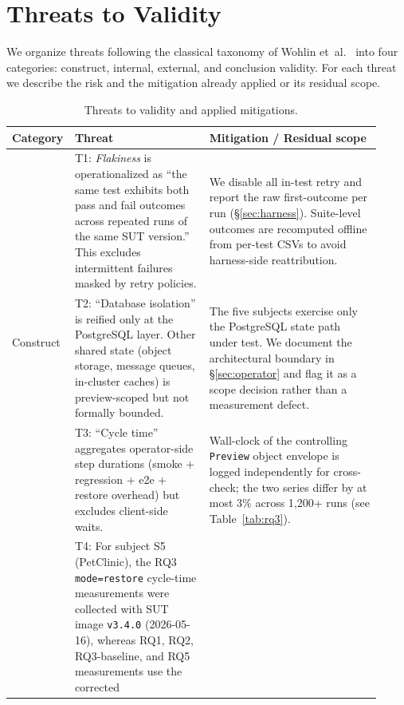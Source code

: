 \section{Threats to Validity}
\label{sec:threats}

We organize threats following the classical taxonomy of Wohlin
et~al.~\cite{wohlin2012experimentation} into four categories: construct,
internal, external, and conclusion validity. For each threat we describe the
risk and the mitigation already applied or its residual scope.

\begin{table}[t]
\centering
\caption{Threats to validity and applied mitigations.}
\label{tab:threats}
\small
\begin{tabular}{p{0.10\linewidth} p{0.36\linewidth} p{0.46\linewidth}}
\hline
\textbf{Category} & \textbf{Threat} & \textbf{Mitigation / Residual scope} \\
\hline
\multirow{3}{*}{Construct}
 & T1: \emph{Flakiness} is operationalized as ``the same test exhibits both
   pass and fail outcomes across repeated runs of the same SUT version.''
   This excludes intermittent failures masked by retry policies.
 & We disable all in-test retry and report the raw first-outcome per run
   (\S\ref{sec:harness}). Suite-level outcomes are recomputed offline from
   per-test CSVs to avoid harness-side reattribution. \\
 & T2: ``Database isolation'' is reified only at the PostgreSQL layer.
   Other shared state (object storage, message queues, in-cluster caches)
   is preview-scoped but not formally bounded.
 & The five subjects exercise only the PostgreSQL state path under test.
   We document the architectural boundary in \S\ref{sec:operator} and flag
   it as a scope decision rather than a measurement defect. \\
 & T3: ``Cycle time'' aggregates operator-side step durations
   (smoke + regression + e2e + restore overhead) but excludes
   client-side waits.
 & Wall-clock of the controlling \texttt{Preview} object envelope is logged
   independently for cross-check; the two series differ by at most 3\% across
   1{,}200+ runs (see Table~\ref{tab:rq3}). \\
 & T4: For subject S5 (PetClinic), the RQ3 \texttt{mode=restore} cycle-time
   measurements were collected with SUT image \texttt{v3.4.0} (2026-05-16),
   whereas RQ1, RQ2, RQ3-baseline, and RQ5 measurements use the corrected

\end{tabular}
\end{table}
